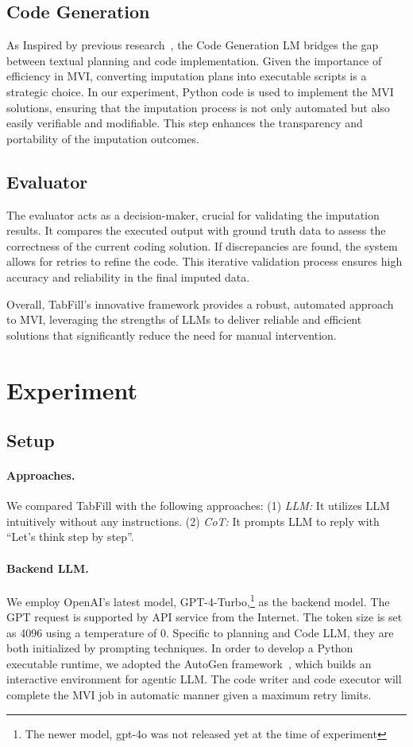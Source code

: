 \documentclass[sigconf]{acmart}
\begin{document}
\subsection{Code Generation}
As Inspired by previous research~\cite{poldrack2023ai}, the Code Generation LM bridges the gap between textual planning and code implementation. Given the importance of efficiency in MVI, converting imputation plans into executable scripts is a strategic choice. In our experiment, Python code is used to implement the MVI solutions, ensuring that the imputation process is not only automated but also easily verifiable and modifiable. This step enhances the transparency and portability of the imputation outcomes.

\subsection{Evaluator}
The evaluator acts as a decision-maker, crucial for validating the imputation results. It compares the executed output with ground truth data to assess the correctness of the current coding solution. If discrepancies are found, the system allows for retries to refine the code. This iterative validation process ensures high accuracy and reliability in the final imputed data.

Overall, TabFill’s innovative framework provides a robust, automated approach to MVI, leveraging the strengths of LLMs to deliver reliable and efficient solutions that significantly reduce the need for manual intervention.

\section{Experiment}

\subsection{Setup}

\paragraph{Approaches.} 
We compared TabFill with the following approaches:
(1) {\em LLM:} It utilizes LLM intuitively without any instructions.
(2) {\em CoT:} It prompts LLM to reply with ``Let’s think step by step''.

\paragraph{Backend LLM.}
We employ OpenAI's latest model, GPT-4-Turbo,\footnote{The newer model, gpt-4o was not released yet at the time of experiment} as the backend model. The GPT request is supported by API service from the Internet. The token size is set as 4096 using a temperature of 0. Specific to planning and Code LLM, they are both initialized by prompting techniques. In order to develop a Python executable runtime, we adopted the AutoGen framework~\cite{wu2023autogen}, which builds an interactive environment for agentic LLM. The code writer and code executor will complete the MVI job in automatic manner given a maximum retry limits.
\end{document}
